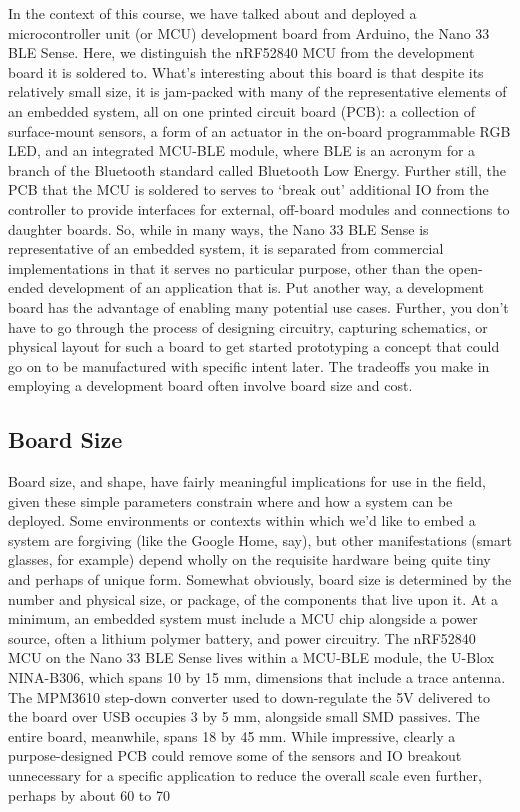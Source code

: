  In the context of this course, we have talked about and deployed a microcontroller unit (or MCU) development board from Arduino, the Nano 33 BLE Sense. Here, we distinguish the nRF52840 MCU from the development board it is soldered to. What’s interesting about this board is that despite its relatively small size, it is jam-packed with many of the representative elements of an embedded system, all on one printed circuit board (PCB): a collection of surface-mount sensors, a form of an actuator in the on-board programmable RGB LED, and an integrated MCU-BLE module, where BLE is an acronym for a branch of the Bluetooth standard called Bluetooth Low Energy. Further still, the PCB that the MCU is soldered to serves to ‘break out’ additional IO from the controller to provide interfaces for external, off-board modules and connections to daughter boards. So, while in many ways, the Nano 33 BLE Sense is representative of an embedded system, it is separated from commercial implementations in that it serves no particular purpose, other than the open-ended development of an application that is. Put another way, a development board has the advantage of enabling many potential use cases. Further, you don’t have to go through the process of designing circuitry, capturing schematics, or physical layout for such a board to get started prototyping a concept that could go on to be manufactured with specific intent later. The tradeoffs you make in employing a development board often involve board size and cost.
    
\subsection{Board Size}

    Board size, and shape, have fairly meaningful implications for use in the field, given these simple parameters constrain where and how a system can be deployed. Some environments or contexts within which we’d like to embed a system are forgiving (like the Google Home, say), but other manifestations (smart glasses, for example) depend wholly on the requisite hardware being quite tiny and perhaps of unique form. Somewhat obviously, board size is determined by the number and physical size, or package, of the components that live upon it. At a minimum, an embedded system must include a MCU chip alongside a power source, often a lithium polymer battery, and power circuitry. The nRF52840 MCU on the Nano 33 BLE Sense lives within a MCU-BLE module, the U-Blox NINA-B306, which spans 10 by 15 mm, dimensions that include a trace antenna. The MPM3610 step-down converter used to down-regulate the 5V delivered to the board over USB occupies 3 by 5 mm, alongside small SMD passives. The entire board, meanwhile, spans 18 by 45 mm. While impressive, clearly a purpose-designed PCB could remove some of the sensors and IO breakout unnecessary for a specific application to reduce the overall scale even further, perhaps by about 60 to 70%
    
